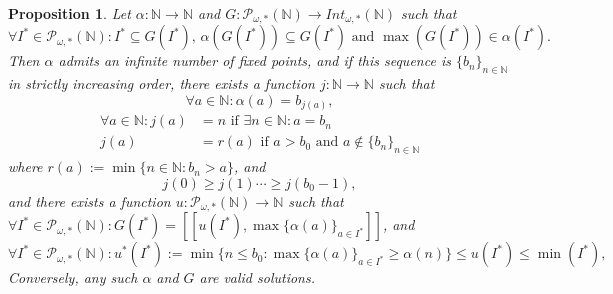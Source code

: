 \documentclass[a4paper,11pt]{article}
\theoremstyle{plain}
\newtheorem{proposition}{Proposition}[section]
\theoremstyle{definition}
\theoremstyle{remark}
\begin{document}
\begin{proposition}
\label{propCharMapPreservingSupersetsWithMaxCondition2}
Let $\alpha : \mathbb{N} \to \mathbb{N}$ and $G : \mathcal{P}_{\omega,*}(\mathbb{N}) \to Int_{\omega,*}(\mathbb{N})$ such that 
\[ \forall I^* \in \mathcal{P}_{\omega,*}(\mathbb{N}) : I^* \subseteq G(I^*) \text{, } \alpha(G(I^*)) \subseteq G(I^*) \text{ and } \max(G(I^*)) \in \alpha(I^*). \]
Then $\alpha$ admits an infinite number of fixed points, and if this sequence is $\{b_n\}_{n \in \mathbb{N}}$ in strictly increasing order, there exists a function $j : \mathbb{N} \to \mathbb{N}$ such that 
\[ \forall a \in \mathbb{N} : \alpha(a) = b_{j(a)}, \]
\begin{align*}
\forall a \in \mathbb{N} : j(a) &= n \text{ if } \exists n \in \mathbb{N} : a = b_{n} \\
j(a) &= r(a)  \text{ if } a > b_0 \text{ and } a \notin \{b_n\}_{n \in \mathbb{N}}
\end{align*}
where $r(a) := \min\{n \in \mathbb{N} : b_n > a \}$, and 
\[ j(0) \geq j(1) \cdots \geq j(b_0 - 1), \]
and there exists a function $u : \mathcal{P}_{\omega,*}(\mathbb{N}) \to \mathbb{N}$ such that $\forall I^* \in  \mathcal{P}_{\omega,*}(\mathbb{N}) : G(I^*) = [\![u(I^*),\max\{\alpha(a)\}_{a \in I^*}]\!]$, and
\[ \forall I^* \in  \mathcal{P}_{\omega,*}(\mathbb{N}) : u^*(I^*) := \min \{n \leq b_0 : \max\{\alpha(a)\}_{a \in I^*} \geq \alpha(n) \} \leq u(I^*) \leq \min(I^*), \]
Conversely, any such $\alpha$ and $G$ are valid solutions.
\end{proposition}
\end{document}
